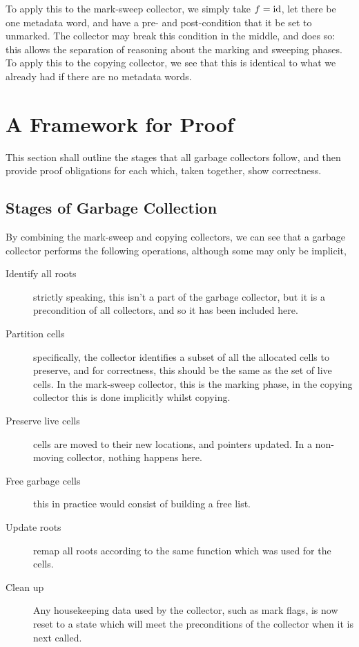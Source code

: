 To apply this to the mark-sweep collector, we simply take $f = \mathrm{id}$,
let there be one metadata word, and have a pre- and post-condition
that it be set to unmarked. The collector may break this condition in
the middle, and does so: this allows the separation of reasoning about
the marking and sweeping phases. To apply this to the copying
collector, we see that this is identical to what we already had if
there are no metadata words.

\section{A Framework for Proof}
\label{sec:gc-framework}

This section shall outline the stages that all garbage collectors
follow, and then provide proof obligations for each which, taken
together, show correctness.

\subsection{Stages of Garbage Collection}
\label{sec:gc-framework-stages}

By combining the mark-sweep and copying collectors, we can see that
a garbage collector performs the following operations, although some
may only be implicit,

\begin{description}
  \item[Identify all roots] strictly speaking, this isn't a part of
    the garbage collector, but it is a precondition of all collectors,
    and so it has been included here.

  \item[Partition cells] specifically, the collector identifies a
    subset of all the allocated cells to preserve, and for
    correctness, this should be the same as the set of live cells. In
    the mark-sweep collector, this is the marking phase, in the
    copying collector this is done implicitly whilst copying.

  \item[Preserve live cells] cells are moved to their new locations,
    and pointers updated. In a non-moving collector, nothing happens
    here.

  \item[Free garbage cells] this in practice would consist of building
    a free list.

  \item[Update roots] remap all roots according to the same function
    which was used for the cells.

  \item[Clean up] Any housekeeping data used by the collector, such as
    mark flags, is now reset to a state which will meet the
    preconditions of the collector when it is next called.
\end{description}


